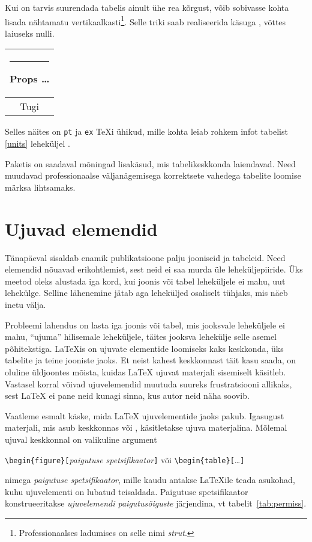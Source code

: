 Kui on tarvis suurendada tabelis ainult ühe rea kõrgust, võib sobivasse
kohta lisada nähtamatu vertikaalkasti\footnote{Professionaalses
ladumises on selle nimi \emph{strut}.}. Selle triki saab
realiseerida käsuga , võttes laiuseks nulli.

\begin{example}
\begin{tabular}{|c|}
\hline
\rule{1pt}{4ex}Props \ldots\\
\hline
\rule{0pt}{4ex}Tugi\\
\hline
\end{tabular}
\end{example}

Selles näites on \texttt{pt} ja \texttt{ex} \TeX i ühikud, mille kohta
leiab rohkem infot tabelist \ref{units} leheküljel \pageref{units}.

Paketis  on saadaval mõningad lisakäsud, mis
tabelikeskkonda laiendavad. Need muudavad professionaalse
väljanägemisega korrektsete vahedega tabelite loomise märksa lihtsamaks.

\section{Ujuvad elemendid}

Tänapäeval sisaldab enamik publikatsioone palju jooniseid ja tabeleid.
Need elemendid nõuavad erikohtlemist, sest neid ei saa murda üle
leheküljepiiride. Üks meetod oleks alustada iga kord, kui joonis või
tabel leheküljele ei mahu, uut lehekülge. Selline lähenemine jätab aga
leheküljed osaliselt tühjaks, mis näeb inetu välja.

Probleemi lahendus on lasta iga joonis või tabel, mis jooksvale
leheküljele ei mahu, "`ujuma"' hilisemale leheküljele, täites jooksva
lehekülje selle asemel põhitekstiga. \LaTeX is on
ujuvate elementide loomiseks kaks keskkonda, üks
tabelite ja teine jooniste jaoks. Et neist kahest keskkonnast täit kasu
saada, on oluline üldjoontes mõista, kuidas \LaTeX{} ujuvat materjali
sisemiselt käsitleb. Vastasel korral võivad ujuvelemendid muutuda
suureks frustratsiooni allikaks, sest \LaTeX{} ei pane neid kunagi
sinna, kus autor neid näha soovib.

Vaatleme esmalt käske, mida \LaTeX{} ujuvelementide jaoks pakub.
Igasugust materjali, mis asub keskkonnas  või ,
käsitletakse ujuva materjalina. Mõlemal ujuval keskkonnal on valikuline
argument
\begin{lscommand}
\verb|\begin{figure}[|\emph{paigutuse spetsifikaator}\verb|]| või
\verb|\begin{table}[|\ldots\verb|]|
\end{lscommand}
\noindent nimega \emph{paigutuse spetsifikaator}, mille kaudu
antakse \LaTeX ile teada asukohad, kuhu ujuvelementi on lubatud
teisaldada. Paigutuse spetsifikaator konstrueeritakse \emph{ujuvelemendi
paigutusõiguste} järjendina, vt tabelit~\ref{tab:permiss}.

